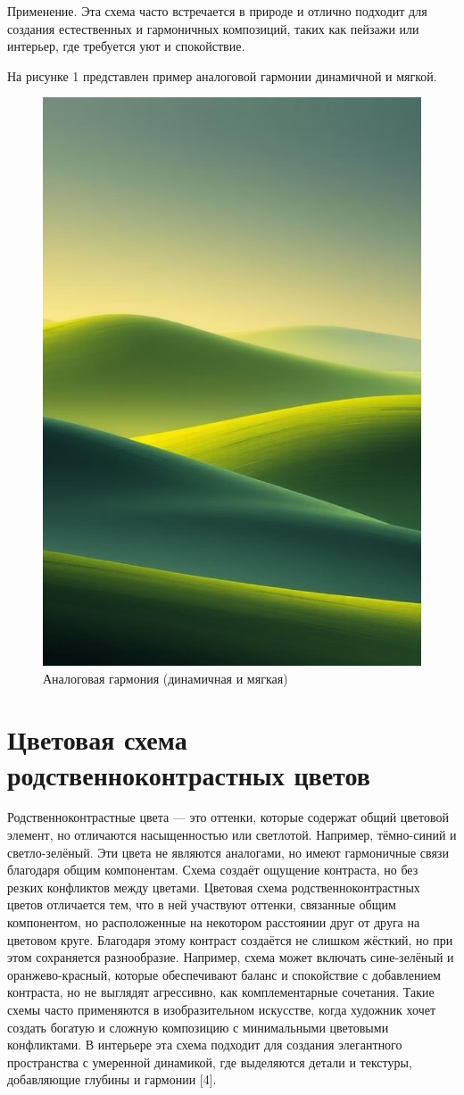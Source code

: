 \documentclass[bachelor, och, referat]{SCWorks}
\begin{document}
Применение. Эта схема часто встречается в природе и отлично подходит для создания естественных и гармоничных композиций, таких как пейзажи или интерьер, где требуется уют и спокойствие.

На рисунке 1 представлен пример аналоговой гармонии динамичной и мягкой.
\begin{figure}
        \includegraphics[width=0.6\linewidth]{analog_example.png} 
        \caption{Аналоговая гармония (динамичная и мягкая)}
 \end{figure}

\section{Цветовая схема родственноконтрастных цветов}
Родственноконтрастные цвета — это оттенки, которые содержат общий цветовой элемент, но отличаются насыщенностью или светлотой. Например, тёмно-синий и светло-зелёный. Эти цвета не являются аналогами, но имеют гармоничные связи благодаря общим компонентам. Схема создаёт ощущение контраста, но без резких конфликтов между цветами.
Цветовая схема родственноконтрастных цветов отличается тем, что в ней участвуют оттенки, связанные общим компонентом, но расположенные на некотором расстоянии друг от друга на цветовом круге. Благодаря этому контраст создаётся не слишком жёсткий, но при этом сохраняется разнообразие. Например, схема может включать сине-зелёный и оранжево-красный, которые обеспечивают баланс и спокойствие с добавлением контраста, но не выглядят агрессивно, как комплементарные сочетания.
Такие схемы часто применяются в изобразительном искусстве, когда художник хочет создать богатую и сложную композицию с минимальными цветовыми конфликтами. В интерьере эта схема подходит для создания элегантного пространства с умеренной динамикой, где выделяются детали и текстуры, добавляющие глубины и гармонии [4].
\end{document}

